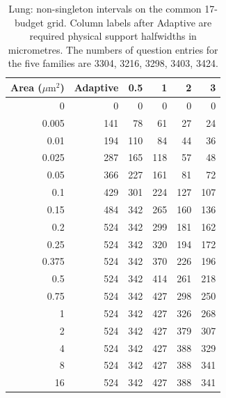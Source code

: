\begin{table}[ht]\centering
\begin{tabular}{rrrrrr}\toprule
Area ($\mu\mathrm m^2$)&Adaptive&0.5&1&2&3\\\midrule
0 & 0 & 0 & 0 & 0 & 0\\
0.005 & 141 & 78 & 61 & 27 & 24\\
0.01 & 194 & 110 & 84 & 44 & 36\\
0.025 & 287 & 165 & 118 & 57 & 48\\
0.05 & 366 & 227 & 161 & 81 & 72\\
0.1 & 429 & 301 & 224 & 127 & 107\\
0.15 & 484 & 342 & 265 & 160 & 136\\
0.2 & 524 & 342 & 299 & 181 & 162\\
0.25 & 524 & 342 & 320 & 194 & 172\\
0.375 & 524 & 342 & 370 & 226 & 196\\
0.5 & 524 & 342 & 414 & 261 & 218\\
0.75 & 524 & 342 & 427 & 298 & 250\\
1 & 524 & 342 & 427 & 326 & 268\\
2 & 524 & 342 & 427 & 379 & 307\\
4 & 524 & 342 & 427 & 388 & 329\\
8 & 524 & 342 & 427 & 388 & 341\\
16 & 524 & 342 & 427 & 388 & 341\\
\bottomrule\end{tabular}
\caption{Lung: non-singleton intervals on the common 17-budget grid. Column labels after Adaptive are required physical support halfwidths in micrometres. The numbers of question entries for the five families are 3304, 3216, 3298, 3403, 3424.}
\end{table}
